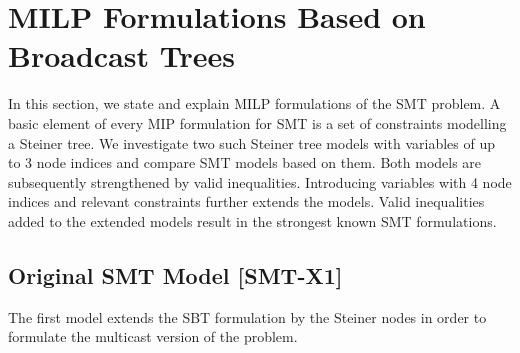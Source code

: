 \section{MILP Formulations Based on Broadcast Trees}
\label{sec:ILP}

In this section, we state and explain MILP formulations of the SMT problem. A basic element of every MIP formulation for SMT is a set of constraints modelling a Steiner tree. We investigate two such Steiner tree models with variables of up to 3 node indices and compare SMT models based on them. Both models are subsequently strengthened by valid inequalities. Introducing variables with 4 node indices and relevant constraints further extends the models. Valid inequalities added to the extended models result in the strongest known SMT formulations.
\subsection{Original SMT Model [SMT-X1]}
The first model extends the SBT formulation \cite{Haugland12Dual} by the Steiner nodes in order to formulate the multicast version of the problem. 
